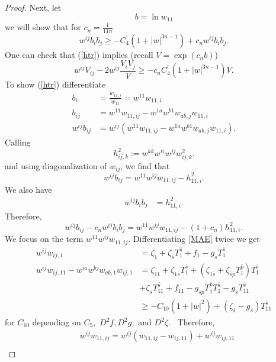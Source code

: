 \documentclass[11pt,letterpaper]{amsart}%
\numberwithin{equation}{section}
\begin{document}
\begin{proof}
Next, let
\[
b=\ln w_{11}%
\]
we will show that for $c_{n}=\frac{1}{11n}$%
\begin{equation}
w^{ij}b_{i}b_{j}\geq-C_{4}^{\prime}\left(  1+\left\vert w\right\vert
^{3n-1}\right)  +c_{n}w^{ij}b_{i}b_{j}. \label{htr}%
\end{equation}
One can check that (\ref{htr}) implies (recall $V=\exp(c_{n}b)$)
\[
w^{ij}V_{ij}-2w^{ij}\frac{V_{i}V_{j}}{V}\geq-c_{n}C_{4}^{\prime}\left(
1+\left\vert w\right\vert ^{3n-1}\right)  V.
\]
To show (\ref{htr}) differentiate
\begin{align*}
b_{i}  &  =\frac{w_{11,i}}{w_{11}}=w^{11}w_{11,i}\\
b_{ij}  &  =w^{11}w_{11,ij}-w^{1a}w^{b1}w_{ab,j}w_{11,i}\\
w^{ij}b_{ij}  &  =w^{ij}\left(  w^{11}w_{11,ij}-w^{1a}w^{b1}w_{ab,j}%
w_{11,i}\right)  .
\end{align*}
Calling
\[
h_{ij,k}^{2}:=w^{kk}w^{ii}w^{jj}w_{ij,k}^{2}.
\]
and using diagonalization of $w_{ij}$, we find that
\begin{equation}
w^{ij}b_{ij}=w^{11}w^{ij}w_{11,ij}-h_{11,i}^{2}. \label{operator-leading-term}%
\end{equation}
We also have
\begin{align*}
w^{ij}b_{i}b_{j}  
&  =h_{11,i}^{2}.%
\end{align*}
Therefore,
\begin{equation}
w^{ij}b_{ij}-c_{n}w^{ij}b_{i}b_{j}=w^{11}w^{ij}w_{11,ij}-(1+c_{n})h_{11,i}%
^{2}. \label{here}%
\end{equation}
We focus on the term $w^{11}w^{ij}w_{11,ij}$. Differentiating \eqref{MAE}
twice we get
\begin{align*}
w^{ij}w_{ij,1}  &  =\zeta_{1}+\zeta_{\bar{s}}T_{1}^{\bar{s}}+f_{1}-g_{s}T_{1}^{\bar{s}}\\
w^{ij}w_{ij,11}-w^{ia}w^{bj}w_{ab,1}w_{ij,1}  &  =\zeta_{11}+\zeta_{1\bar{s}%
}T_{1}^{\bar{s}}+(\zeta_{1\bar{s}}+\zeta_{\bar{s}\bar{p}}T_{1}^{\bar{p}})T_{1}^{\bar{s}}\\
&  +\zeta_{\bar{s}}T_{11}^{\bar{s}}+f_{11}-g_{\bar{s}\bar{p}}T_{1}^{\bar{p}}T_{1}^{\bar{s}}-g_{\bar{s}}   T_{11}^{\bar{s}}\\
&  \geq-C_{10}(1+\left\vert w\right\vert ^{2})+\left(  \zeta_{\bar{s}}%
-g_{\bar{s}}\right)  T_{11}^{\bar{s}}%
\end{align*}
for $C_{10}$ depending on $C_{5},$ $D^{2}f,D^{2}g,$ and $D^{2}\zeta.$
\ Therefore,
\begin{align}
&  w^{ij}w_{11,ij}=w^{ij}(w_{11,ij}-w_{ij,11})+w^{ij}w_{ij,11}\nonumber\\

\end{align}
\end{proof}
\end{document}
